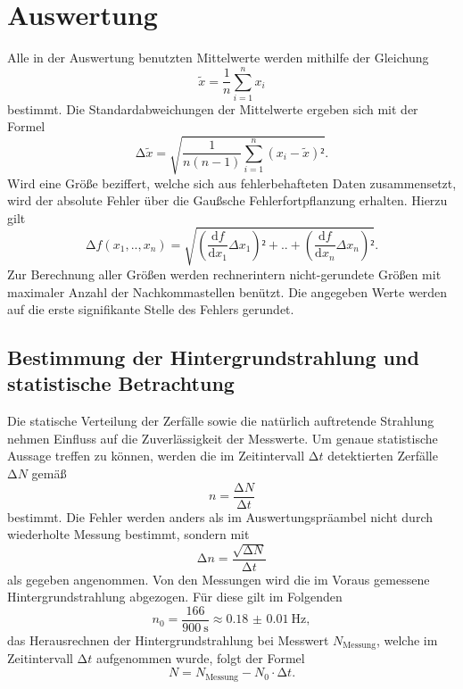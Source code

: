 \section{Auswertung}
\label{sec:Auswertung}

Alle in der Auswertung benutzten Mittelwerte werden mithilfe der Gleichung
\begin{equation}
\tilde{x}=\frac{1}{n}\sum_{i=1}^n {x_i}
\end{equation}
bestimmt. Die Standardabweichungen der Mittelwerte ergeben sich mit der Formel
\begin{equation}
\mathup\Delta{\tilde{x}}=\sqrt{\frac{1}{n(n-1)}\sum_{i=1}^n {(x_i-\tilde{x})²}}.
\end{equation}
Wird eine Größe beziffert, welche sich aus fehlerbehafteten Daten zusammensetzt, wird der absolute Fehler über die Gaußsche Fehlerfortpflanzung erhalten.
Hierzu gilt
\begin{equation}
\mathup\Delta{f}(x_1,..,x_n)=\sqrt{\left(\frac{\mathup{d}f}{\mathup{d}x_1}\Delta{x_1}\right)²+..+\left(\frac{\mathup{d}f}{\mathup{d}x_n}\Delta{x_n}\right)²}.
\end{equation}
Zur Berechnung aller Größen werden rechnerintern nicht-gerundete Größen mit maximaler Anzahl der Nachkommastellen benützt.
Die angegeben Werte werden auf die erste signifikante Stelle des Fehlers gerundet.

\subsection{Bestimmung der Hintergrundstrahlung und statistische Betrachtung}
\label{sec:Auswertung_hintergrund}
Die statische Verteilung der Zerfälle sowie die natürlich auftretende Strahlung nehmen Einfluss auf die Zuverlässigkeit der Messwerte.
Um genaue statistische Aussage treffen zu können, werden die im Zeitintervall $\mathup\Delta t$ detektierten Zerfälle $\mathup\Delta N$ gemäß
\begin{equation}
	n=\frac{\mathup\Delta N}{\mathup\Delta t}
\end{equation}
bestimmt.
Die Fehler werden anders als im Auswertungspräambel nicht durch wiederholte Messung bestimmt, sondern mit
\begin{equation}
	\mathup\Delta n=\frac{\sqrt{\mathup\Delta N}}{\mathup\Delta t}
\end{equation}
als gegeben angenommen.
Von den Messungen wird die im Voraus gemessene Hintergrundstrahlung abgezogen. 
Für diese gilt im Folgenden
\begin{equation}
	n_0=\frac{166}{\SI{900}{\second}}\approx\SI{0.18(1)}{\hertz},
\end{equation}
das Herausrechnen der Hintergrundstrahlung bei Messwert $N_\text{Messung}$, welche im Zeitintervall $\mathup\Delta t$ aufgenommen wurde, folgt der Formel
\begin{equation}
	N=N_{\text{Messung}}-N_0\cdot\mathup\Delta t.
\end{equation}

